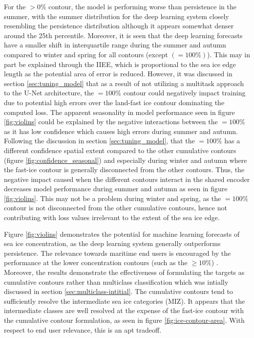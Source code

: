 \documentclass[../main/thesis]{subfiles}
\begin{document}
For the $> 0\%$ contour, the model is performing worse than persistence in the summer, with the summer distribution for the deep learning system closely resembling the persistence distribution although it appears somewhat denser around the 25th percentile. Moreover, it is seen that the deep learning forecasts have a smaller shift in interquartile range during the summer and autumn compared to winter and spring for all contours (except $(=100\%)$). This may in part be explained through the IIEE, which is proportional to the sea ice edge length \cite{Goessling2016} as the potential area of error is reduced. However, it was discussed in section \ref{sec:tuning_model} that as a result of not utilizing a multitask approach to the U-Net architecture, the $=100\%$ contour could negatively impact training due to potential high errors over the land-fast ice contour dominating the computed loss. The apparent seasonality in model performance seen in figure \ref{fig:violins} could be explained by the negative interactions between the $=100\%$ as it has low confidence which causes high errors during summer and autumn. Following the discussion in section \ref{sec:tuning_model}, that the $=100\%$ has a different confidence spatial extent compared to the other cumulative contours (figure \ref{fig:confidence_seasonal}) and especially during winter and autumn where the fast-ice contour is generally disconnected from the other contours. Thus, the negative impact caused when the different contours interact in the shared encoder decreases model performance during summer and autumn as seen in figure \ref{fig:violins}. This may not be a problem during winter and spring, as the $=100\%$ contour is not disconnected from the other cumulative contours, hence not contributing with loss values irrelevant to the extent of the sea ice edge.

Figure \ref{fig:violins} demonstrates the potential for machine learning forecasts of sea ice concentration, as the deep learning system generally outperforms persistence. The relevance towards maritime end users is encouraged by the performance at the lower concentration contours (such as the $\geq 10\%$) \citep{Wagner2020, Veland2021}. Moreover, the results demonstrate the effectiveness of formulating the targets as cumulative contours rather than multiclass classification which was intially discussed in section \ref{sec:multiclass-intitial}. The cumulative contours tend to sufficiently resolve the intermediate sea ice categories (MIZ). It appears that the intermediate classes are well resolved at the expense of the fast-ice contour with the cumulative contour formulation, as seen in figure \ref{fig:ice-contour-area}. With respect to end user relevance, this is an apt tradeoff. 
\end{document}
